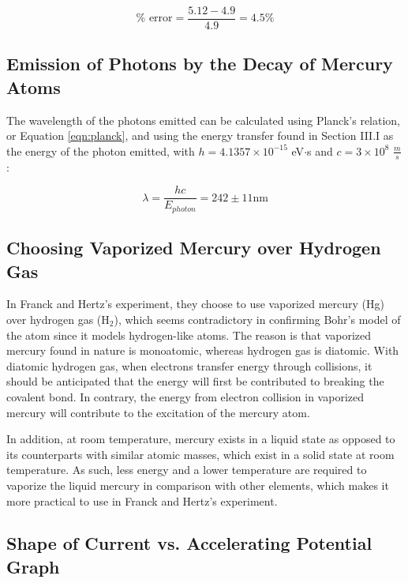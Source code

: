 \documentclass[12pt, letterpaper, twoside]{article}
\begin{document}
\begin{equation*}
    \%\text{ error} = \frac{5.12 - 4.9}{4.9} = 4.5\% 
\end{equation*}

\subsection{Emission of Photons by the Decay of Mercury Atoms}

The wavelength of the photons emitted can be calculated using Planck's relation, or Equation \ref{eqn:planck}, and using the energy transfer found in Section III.I as the energy of the photon emitted, with $h = 4.1357 \times 10^{-15}$ eV$\cdot$s and $c = 3 \times 10^{8}$ $\frac{m}{s}$: 

\begin{equation*}
    \lambda = \frac{hc}{E_{photon}} = 242\pm11\text{nm}
\end{equation*}

\subsection{Choosing Vaporized Mercury over Hydrogen Gas}

In Franck and Hertz's experiment, they choose to use vaporized mercury (Hg) over hydrogen gas (H$_2$), which seems contradictory in confirming Bohr's model of the atom since it models hydrogen-like atoms. The reason is that vaporized mercury found in nature is monoatomic, whereas hydrogen gas is diatomic. With diatomic hydrogen gas, when electrons transfer energy through collisions, it should be anticipated that the energy will first be contributed to breaking the covalent bond. In contrary, the energy from electron collision in vaporized mercury will contribute to the excitation of the mercury atom. 

In addition, at room temperature, mercury exists in a liquid state as opposed to its counterparts with similar atomic masses, which exist in a solid state at room temperature. As such, less energy and a lower temperature are required to vaporize the liquid mercury in comparison with other elements, which makes it more practical to use in Franck and Hertz's experiment.

\subsection{Shape of Current vs. Accelerating Potential Graph}
\end{document}
